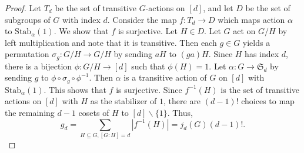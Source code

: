 \documentclass{article}
\newcommand*{\sym}{\mathfrak{S}}
\begin{document}
\begin{proof}
  Let $T_d$ be the set of transitive $G$-actions on $[d]$, and let $D$ be the set of subgroups of $G$ with index $d$. Consider the map $f: T_d \to D$ which maps action $\alpha$ to $\text{Stab}_\alpha(1)$. We show that $f$ is surjective. Let $H \in D$. Let $G$ act on $G/H$ by left multiplication and note that it is transitive. Then each $g \in G$ yields a permutation $\sigma_g: G/H \to G/H$ by sending $aH$ to $(ga)H$. Since $H$ has index $d$, there is a bijection $\phi: G/H \to [d]$ such that $\phi(H) = 1$. Let $\alpha: G \to \sym_d$ by sending $g$ to $\phi \circ \sigma_g \circ \phi^{-1}$. Then $\alpha$ is a transitive action of $G$ on $[d]$ with $\text{Stab}_\alpha(1)$. This shows that $f$ is surjective. Since $f^{-1}(H)$ is the set of transitive actions on $[d]$ with $H$ as the stabilizer of $1$, there are $(d - 1)!$ choices to map the remaining $d - 1$ cosets of $H$ to $[d]\backslash\{1\}$. Thus, 
  \[
    g_d = \sum_{H \subseteq G, [G: H] = d} |f^{-1}(H)| = j_d(G)(d - 1)!.
  \]
\end{proof}

\newpage
\end{document}
